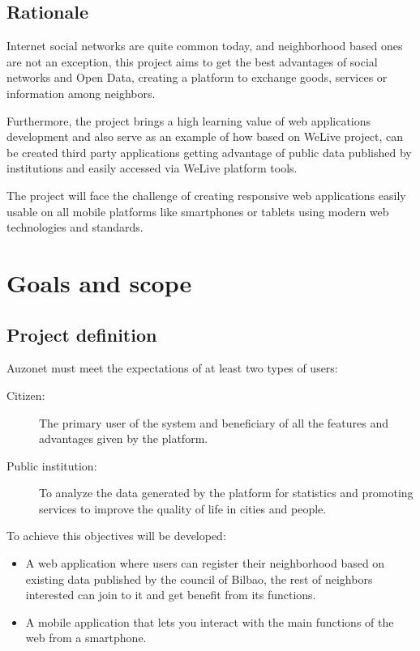 \documentclass{DeustoFDP}
\begin{document}
\section{Rationale}
Internet social networks are quite common today, and neighborhood based ones are not an exception, this project aims to get the best advantages of social networks and Open Data, creating a platform to exchange goods, services or information among neighbors.

Furthermore, the project brings a high learning value of web applications development and also serve as an example of how based on WeLive project, can be created third party applications getting advantage of public data published by institutions and easily accessed via WeLive platform tools.

The project will face the challenge of creating responsive web applications easily usable on all mobile platforms like smartphones or tablets using modern web technologies and standards. 
\chapter{Goals and scope}\label{cha:goalsandscope}
\section{Project definition}
Auzonet must meet the expectations of at least two types of users:
\begin{description}
	\item[Citizen:] The primary user of the system and beneficiary of all the features and advantages given by the platform.
	\item[Public institution:] To analyze the data generated by the platform for statistics and promoting services to improve the quality of life in cities and people.
\end{description}

To achieve this objectives will be developed:
\begin{itemize}
	\item A web application where users can register their neighborhood based on existing data published by the council of Bilbao, the rest of neighbors interested can join to it and get benefit from its functions.
	
	\item A mobile application that lets you interact with the main functions of the web from a smartphone.
\end{itemize}
\end{document}
